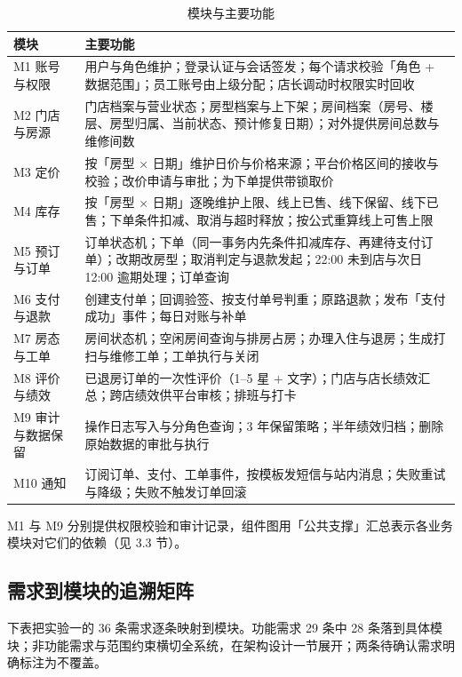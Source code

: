 \begin{table}[H]
\centering
\caption{模块与主要功能}
\tabfont
\begin{tabularx}{\textwidth}{@{}L{2.9cm}X@{}}
\toprule
模块 & 主要功能 \\
\midrule
M1 账号与权限 & 用户与角色维护；登录认证与会话签发；每个请求校验「角色 + 数据范围」；员工账号由上级分配；店长调动时权限实时回收 \\
M2 门店与房源 & 门店档案与营业状态；房型档案与上下架；房间档案（房号、楼层、房型归属、当前状态、预计修复日期）；对外提供房间总数与维修间数 \\
M3 定价 & 按「房型 $\times$ 日期」维护日价与价格来源；平台价格区间的接收与校验；改价申请与审批；为下单提供带锁取价 \\
M4 库存 & 按「房型 $\times$ 日期」逐晚维护上限、线上已售、线下保留、线下已售；下单条件扣减、取消与超时释放；按公式重算线上可售上限 \\
M5 预订与订单 & 订单状态机；下单（同一事务内先条件扣减库存、再建待支付订单）；改期改房型；取消判定与退款发起；22:00 未到店与次日 12:00 逾期处理；订单查询 \\
M6 支付与退款 & 创建支付单；回调验签、按支付单号判重；原路退款；发布「支付成功」事件；每日对账与补单 \\
M7 房态与工单 & 房间状态机；空闲房间查询与排房占房；办理入住与退房；生成打扫与维修工单；工单执行与关闭 \\
M8 评价与绩效 & 已退房订单的一次性评价（1--5 星 + 文字）；门店与店长绩效汇总；跨店绩效供平台审核；排班与打卡 \\
M9 审计与数据保留 & 操作日志写入与分角色查询；3 年保留策略；半年绩效归档；删除原始数据的审批与执行 \\
M10 通知 & 订阅订单、支付、工单事件，按模板发短信与站内消息；失败重试与降级；失败不触发订单回滚 \\
\bottomrule
\end{tabularx}
\end{table}

M1 与 M9 分别提供权限校验和审计记录，组件图用「公共支撑」汇总表示各业务模块对它们的依赖（见 3.3 节）。

\subsection{需求到模块的追溯矩阵}

下表把实验一的 36 条需求逐条映射到模块。功能需求 29 条中 28 条落到具体模块；非功能需求与范围约束横切全系统，在架构设计一节展开；两条待确认需求明确标注为不覆盖。

